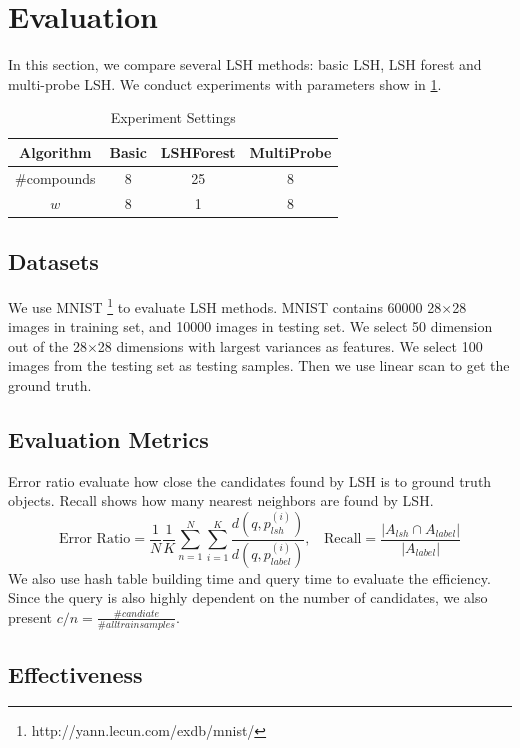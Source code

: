 \section{Evaluation}
In this section, we compare several LSH methods: basic LSH, LSH forest and multi-probe LSH.
We conduct experiments with parameters show in \cref{tbl:exp-settings}.

\begin{table}
\centering
  \caption{Experiment Settings}
  \begin{tabular}{cccc}
		\hline
		Algorithm & Basic & LSHForest & MultiProbe  \\ \hline
		\#compounds & 8 & 25 & 8 \\\hline
		$w$ & 8 & 1 & 8 \\\hline
	\end{tabular}
	\label{tbl:exp-settings}
\end{table}
\subsection{Datasets}
We use MNIST \footnote{http://yann.lecun.com/exdb/mnist/} to evaluate LSH methods. MNIST contains 60000 28$\times$28 images in training set, and 10000 images in testing set.
We select 50 dimension out of the 28$\times$28 dimensions with largest variances as features.
We select 100 images from the testing set as testing samples.
Then we use linear scan to get the ground truth.
\subsection{Evaluation Metrics}
Error ratio evaluate how close the candidates found by LSH is to ground truth objects.
Recall shows how many nearest neighbors are found by LSH.
$$
\text{Error Ratio}=\frac{1}{N}\frac{1}{K}\sum_{n=1}^{N}\sum_{i=1}^{K}\frac{d(q, p_{lsh}^{(i)})}{d(q, p_{label}^{(i)})}, \>\>\>\>
\text{Recall}=\frac{|A_{lsh}\cap A_{label}|}{|A_{label}|}
$$
We also use hash table building time and query time to evaluate the efficiency. Since the query is also highly dependent on the number of candidates, we also present $c/n=\frac{\#candiate}{\#all train samples}$.

\subsection{Effectiveness}


